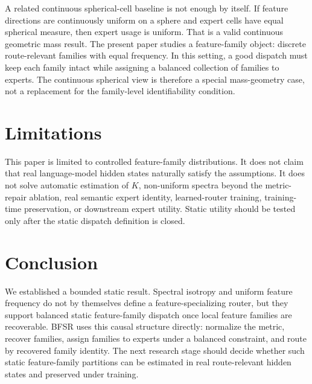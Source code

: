 \documentclass{article}
\begin{document}
A related continuous spherical-cell baseline is not enough by itself.  If feature
directions are continuously uniform on a sphere and expert cells have equal
spherical measure, then expert usage is uniform.  That is a valid continuous
geometric mass result.  The present paper studies a feature-family object:
discrete route-relevant families with equal frequency.  In this setting, a good
dispatch must keep each family intact while assigning a balanced collection of
families to experts.  The continuous spherical view is therefore a special
mass-geometry case, not a replacement for the family-level identifiability
condition.

\section{Limitations}

This paper is limited to controlled feature-family distributions.  It does not
claim that real language-model hidden states naturally satisfy the assumptions.
It does not solve automatic estimation of \(K\), non-uniform spectra beyond the
metric-repair ablation, real semantic expert identity, learned-router training,
training-time preservation, or downstream expert utility.  Static utility should
be tested only after the static dispatch definition is closed.

\section{Conclusion}

We established a bounded static result.  Spectral isotropy and uniform feature
frequency do not by themselves define a feature-specializing router, but they
support balanced static feature-family dispatch once local feature families are
recoverable.  BFSR uses this causal structure directly: normalize the metric,
recover families, assign families to experts under a balanced constraint, and
route by recovered family identity.  The next research stage should decide
whether such static feature-family partitions can be estimated in real
route-relevant hidden states and preserved under training.



\end{document}
